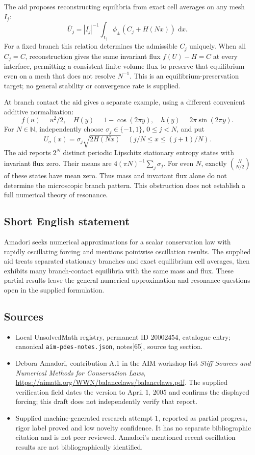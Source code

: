 \documentclass[11pt]{article}
\newcommand{\N}{\mathbb{N}}
\newcommand{\dd}{\,\mathrm{d}}
\begin{document}
The aid proposes reconstructing equilibria from exact cell averages on any mesh \(I_j\):
\[
 \overline U_j=|I_j|^{-1}\int_{I_j}\phi_\pm(C_j+H(Nx))\,\dd x.
\]
For a fixed branch this relation determines the admissible \(C_j\) uniquely. When all \(C_j=C\), reconstruction gives the same invariant flux \(f(U)-H=C\) at every interface, permitting a consistent finite-volume flux to preserve that equilibrium even on a mesh that does not resolve \(N^{-1}\). This is an equilibrium-preservation target; no general stability or convergence rate is supplied.

At branch contact the aid gives a separate example, using a different convenient additive normalization:
\[
 f(u)=u^2/2,\quad H(y)=1-\cos(2\pi y),\quad h(y)=2\pi\sin(2\pi y).
\]
For \(N\in\N\), independently choose \(\sigma_j\in\{-1,1\}\), \(0\le j<N\), and put
\[
 U_\sigma(x)=\sigma_j\sqrt{2H(Nx)}
 \quad (j/N\le x\le(j+1)/N).
\]
The aid reports \(2^N\) distinct periodic Lipschitz stationary entropy states with invariant flux zero. Their means are \(4(\pi N)^{-1}\sum_j\sigma_j\). For even \(N\), exactly \(\binom{N}{N/2}\) of these states have mean zero. Thus mass and invariant flux alone do not determine the microscopic branch pattern. This obstruction does not establish a full numerical theory of resonance.
\subsection{Short English statement}
Amadori seeks numerical approximations for a scalar conservation law with rapidly oscillating forcing and mentions pointwise oscillation results. The supplied aid treats separated stationary branches and exact equilibrium cell averages, then exhibits many branch-contact equilibria with the same mass and flux. These partial results leave the general numerical approximation and resonance questions open in the supplied formulation.
\subsection{Sources}
\begin{itemize}
\item Local UnsolvedMath registry, permanent ID 20002454, catalogue entry; canonical \texttt{aim-pdes-notes.json}, notes[65], source tag section.
\item Debora Amadori, contribution A.1 in the AIM workshop list \emph{Stiff Sources and Numerical Methods for Conservation Laws}, \url{https://aimath.org/WWN/balancelaws/balancelaws.pdf}. The supplied verification field dates the version to April 1, 2005 and confirms the displayed forcing; this draft does not independently verify that report.
\item Supplied machine-generated research attempt 1, reported as partial progress, rigor label proved and low novelty confidence. It has no separate bibliographic citation and is not peer reviewed. Amadori's mentioned recent oscillation results are not bibliographically identified.
\end{itemize}
\end{document}
